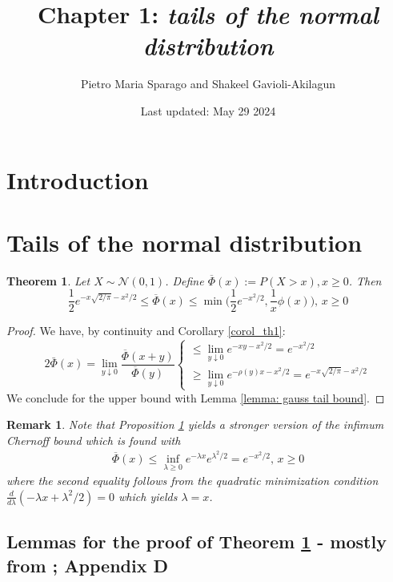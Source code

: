\documentclass{article}
\title{Chapter 1: \emph{tails of the normal distribution}}
\author{Pietro Maria Sparago and Shakeel Gavioli-Akilagun}
\date{\small Last updated: May 29 2024}
\newtheorem{remark}{Remark}[section]
\newtheorem{theorem}{Theorem}[section]
\begin{document}
\maketitle

\section{Introduction}

\section{Tails of the normal distribution}

\begin{theorem}  
\label{th1}	
Let $X \sim \mathcal{N}(0,1)$. Define $\overline{\Phi}(x):=P(X>x),x\geq 0$. Then
\begin{equation}
\frac{1}{2}e^{-x\sqrt{2/\pi}-x^2/2}\leq \overline{\Phi}(x)\leq \min\bigg(\frac{1}{2}e^{-x^2/2},\frac{1}{x}\phi(x)\bigg),\,x\geq 0
\end{equation}
\end{theorem}
\begin{proof} We have, by continuity and Corollary \ref{corol_th1}:
\begin{equation}
2\bar{\Phi}(x)=\lim_{y\downarrow 0}\frac{\overline{\Phi}(x+y)}{\overline{\Phi}(y)}
\begin{cases}
\leq \lim_{y\downarrow 0}e^{-xy-x^2/2}=e^{-x^2/2}\\
\geq \lim_{y\downarrow 0}e^{-\rho(y)x-x^2/2}=e^{-x\sqrt{2/\pi}-x^2/2}
\end{cases}
\end{equation}
We conclude for the upper bound with Lemma \ref{lemma: gauss tail bound}.
\end{proof}

\begin{remark} Note that Proposition \ref{th1} yields a stronger version of the infimum Chernoff bound which is found with
$$\begin{aligned}\overline{\Phi}(x)\leq \inf_{\lambda \geq 0}e^{-\lambda x}e^{\lambda^2/2}=e^{-x^2/2},\,x\geq 0
\end{aligned}$$
where the second equality follows from the quadratic minimization condition $\frac{d}{d\lambda}(-\lambda x+\lambda^2/2)=0$ which yields $\lambda=x$.
\end{remark}

\subsection{Lemmas for the proof of Theorem \ref{th1} - mostly from \cite{pollard2002user}; Appendix D}
\end{document}
